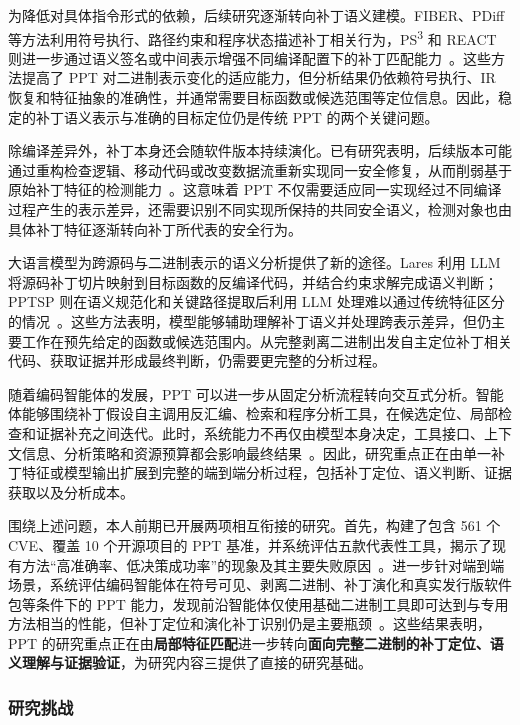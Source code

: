 为降低对具体指令形式的依赖，后续研究逐渐转向补丁语义建模。FIBER、PDiff 等方法利用符号执行、路径约束和程序状态描述补丁相关行为，PS\textsuperscript{3} 和 REACT 则进一步通过语义签名或中间表示增强不同编译配置下的补丁匹配能力~\cite{fiber,pdiff,ps3,react}。这些方法提高了 PPT 对二进制表示变化的适应能力，但分析结果仍依赖符号执行、IR 恢复和特征抽象的准确性，并通常需要目标函数或候选范围等定位信息。因此，稳定的补丁语义表示与准确的目标定位仍是传统 PPT 的两个关键问题。

除编译差异外，补丁本身还会随软件版本持续演化。已有研究表明，后续版本可能通过重构检查逻辑、移动代码或改变数据流重新实现同一安全修复，从而削弱基于原始补丁特征的检测能力~\cite{patchevolution}。这意味着 PPT 不仅需要适应同一实现经过不同编译过程产生的表示差异，还需要识别不同实现所保持的共同安全语义，检测对象也由具体补丁特征逐渐转向补丁所代表的安全行为。

大语言模型为跨源码与二进制表示的语义分析提供了新的途径。Lares 利用 LLM 将源码补丁切片映射到目标函数的反编译代码，并结合约束求解完成语义判断；PPTSP 则在语义规范化和关键路径提取后利用 LLM 处理难以通过传统特征区分的情况~\cite{lares,pptsp}。这些方法表明，模型能够辅助理解补丁语义并处理跨表示差异，但仍主要工作在预先给定的函数或候选范围内。从完整剥离二进制出发自主定位补丁相关代码、获取证据并形成最终判断，仍需要更完整的分析过程。

随着编码智能体的发展，PPT 可以进一步从固定分析流程转向交互式分析。智能体能够围绕补丁假设自主调用反汇编、检索和程序分析工具，在候选定位、局部检查和证据补充之间迭代。此时，系统能力不再仅由模型本身决定，工具接口、上下文信息、分析策略和资源预算都会影响最终结果~\cite{sweagent,aiagentsthatmatter}。因此，研究重点正在由单一补丁特征或模型输出扩展到完整的端到端分析过程，包括补丁定位、语义判断、证据获取以及分析成本。

围绕上述问题，本人前期已开展两项相互衔接的研究。首先，构建了包含 561 个 CVE、覆盖 10 个开源项目的 PPT 基准，并系统评估五款代表性工具，揭示了现有方法“高准确率、低决策成功率”的现象及其主要失败原因~\cite{zhang2026pptempirical}。进一步针对端到端场景，系统评估编码智能体在符号可见、剥离二进制、补丁演化和真实发行版软件包等条件下的 PPT 能力，发现前沿智能体仅使用基础二进制工具即可达到与专用方法相当的性能，但补丁定位和演化补丁识别仍是主要瓶颈~\cite{zhang2026agenticppt}。这些结果表明，PPT 的研究重点正在由\textbf{局部特征匹配}进一步转向\textbf{面向完整二进制的补丁定位、语义理解与证据验证}，为研究内容三提供了直接的研究基础。

\subsubsection{研究挑战}


